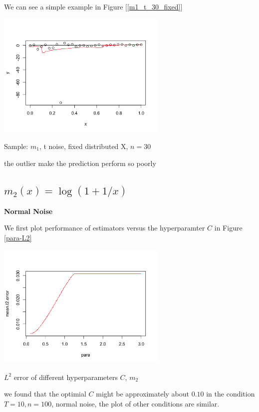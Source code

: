 \documentclass[twoside]{article}
\begin{document}
We can see a simple example in Figure [\ref{m1_t_30_fixed}]

\begin{center}
\makeatletter
\def\@captype{figure}
\makeatother
\includegraphics [height=6cm]{code/m1_t_30_fixed.png}
\caption{Sample: $m_1$, t noise, fixed distributed X, $n=30$}
\label{m1_t_30_fixed}
\end{center}

the outlier make the prediction perform so poorly

\subsection{$m_2(x)=\log(1+1/x)$}

\noindent \textbf{Normal Noise}

We first plot performance of estimators versus the hyperparamter $C$ in Figure \ref{para-L2}

\begin{center}
\makeatletter
\def\@captype{figure}
\makeatother
\includegraphics [height=6cm]{code/para_m2.png}
\caption{$L^2$ error of different hyperparameters $C$, $m_2$}
\label{para-L2}
\end{center}

we found that the optimial $C$ might be approximately about $0.10$ in the condition $T=10, n=100$, normal noise, the plot of other conditions are similar.
\end{document}

